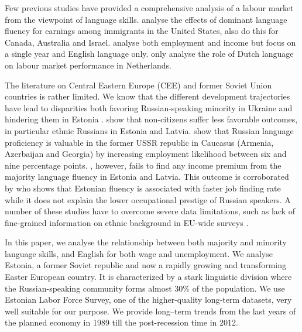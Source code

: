 \documentclass[12pt, a4paper]{article}
\begin{document}
Few previous studies have provided a comprehensive analysis of a labour
market from the viewpoint of language skills.
\citet{Chiswick1995, chiswick+miller2002, chiswick+miller2007,
  Bellante1998, Chiswick2010} analyse the effects of dominant language
fluency for earnings among immigrants in the United States, 
\citet{Chiswick1995} also do this for Canada, Australia and Israel.
\citet{leslie+lindley2001} analyse both employment and income but
focus on a single year and English language only.
\citet{YaoandOurs2015} only analyse the role of Dutch language
on labour market performance in Netherlands.  

The literature on Central Eastern Europe (CEE) and former Soviet Union
countries is rather limited.  We know that the different development
trajectories have lead to disparities both favoring Russian-speaking
minority in Ukraine \citep{Constant2011} and hindering them in Estonia
\citep{Leping2008}.  \citet{Kahanec2009} show that non-citizens suffer
less favorable outcomes, in particular ethnic Russians in Estonia and
Latvia. 
\cite{Alan2015} show that Russian language proficiency is valuable in
the former USSR republic in Caucasus (Armenia, Azerbaijan and
Georgia) by increasing employment likelihood between six and nine
percentage points.  \citet{Toomet2011}, however, fails to find any
income premium from the majority language fluency in Estonia and
Latvia.  This outcome is corroborated by \citet{Lindemann2013} who shows that Estonian fluency
is associated with faster job finding rate while it does not
explain the lower occupational prestige of Russian speakers.  
A number of these studies have to overcome severe data limitations,
such as lack of fine-grained information on ethnic background in
EU-wide surveys \citep{Kahanec2010}.

In this paper, we analyse the relationship between both
majority and minority language skills, and English for both
wage and unemployment.  We analyse Estonia, a former Soviet republic
and now a rapidly growing and
transforming Easter European country.  It is characterized by a stark linguistic division
where the Russian-speaking community forms almost 30\% of
the population.  We use Estonian Labor Force Survey, one of the
higher-quality long-term datasets, very well suitable for our
purpose.  We provide long--term trends from the last years
of the planned economy in 1989 till the post-recession time in 2012.
\end{document}
